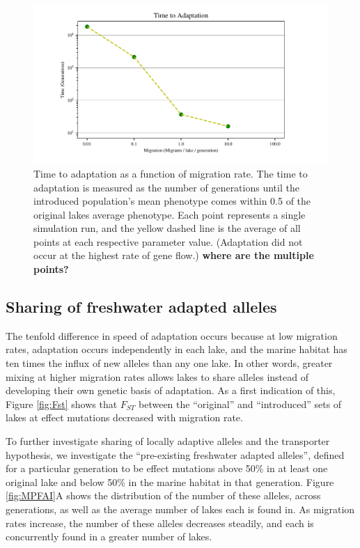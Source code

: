 \documentclass{article}
\begin{document}
\begin{figure}
	\begin{center}
  		\includegraphics{Final_Plots/Time_Adapt.pdf}
  		\caption{
		Time to adaptation as a function of migration rate.
        The time to adaptation is measured as the number of generations until
		the introduced population's mean phenotype 
        comes within 0.5 of the original lakes average phenotype. 
		Each point represents a single simulation run,
		and the yellow dashed line is the average of all points at each respective parameter value.
        (Adaptation did not occur at the highest rate of gene flow.)
        \textbf{where are the multiple points?}
        } \label{fig:TimeToAdaptation}
	\end{center}
\end{figure}


\subsection*{Sharing of freshwater adapted alleles}

The tenfold difference in speed of adaptation occurs because at low migration rates, 
adaptation occurs independently in each lake,
and the marine habitat has ten times the influx of new alleles than any one lake. 
In other words, greater mixing at higher migration rates 
allows lakes to share alleles instead of developing their own genetic basis of adaptation. 
As a first indication of this, Figure \ref{fig:Fst} 
shows that $F_{ST}$ between the ``original'' and ``introduced'' sets of lakes 
at effect mutations decreased with migration rate.

To further investigate sharing of locally adaptive alleles and the transporter hypothesis, we investigate the ``pre-existing freshwater adapted alleles'',
defined for a particular generation to be effect mutations above 50\% in at least one original lake and below 50\% in the marine habitat in that generation.
Figure \ref{fig:MPFAI}A shows the distribution of the number of these alleles, across generations, as well as the average number of lakes each is found in. As migration rates increase, the number of these alleles decreases steadily, and each is concurrently found in a greater number of lakes.
\end{document}
